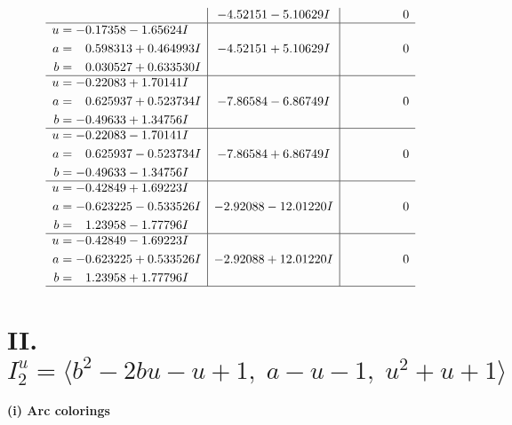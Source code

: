 \documentclass[1p]{elsarticle_modified}
\theoremstyle{definition}
\begin{document}
$$\begin{array}{c|c|c}
 & -4.52151 - 5.10629 I & \phantom{-0.000000 } 0 \\ \hline\begin{aligned}
u &= -0.17358 - 1.65624 I \\
a &= \phantom{-}0.598313 + 0.464993 I \\
b &= \phantom{-}0.030527 + 0.633530 I\end{aligned}
 & -4.52151 + 5.10629 I & \phantom{-0.000000 } 0 \\ \hline\begin{aligned}
u &= -0.22083 + 1.70141 I \\
a &= \phantom{-}0.625937 + 0.523734 I \\
b &= -0.49633 + 1.34756 I\end{aligned}
 & -7.86584 - 6.86749 I & \phantom{-0.000000 } 0 \\ \hline\begin{aligned}
u &= -0.22083 - 1.70141 I \\
a &= \phantom{-}0.625937 - 0.523734 I \\
b &= -0.49633 - 1.34756 I\end{aligned}
 & -7.86584 + 6.86749 I & \phantom{-0.000000 } 0 \\ \hline\begin{aligned}
u &= -0.42849 + 1.69223 I \\
a &= -0.623225 - 0.533526 I \\
b &= \phantom{-}1.23958 - 1.77796 I\end{aligned}
 & -2.92088 - 12.01220 I & \phantom{-0.000000 } 0 \\ \hline\begin{aligned}
u &= -0.42849 - 1.69223 I \\
a &= -0.623225 + 0.533526 I \\
b &= \phantom{-}1.23958 + 1.77796 I\end{aligned}
 & -2.92088 + 12.01220 I & \phantom{-0.000000 } 0\\
 \hline 
 \end{array}$$\newpage\newpage\renewcommand{\arraystretch}{1}
\centering \section*{II. $I^u_{2}= \langle b^2-2 b u- u+1,\;a- u-1,\;u^2+u+1 \rangle$}
\flushleft \textbf{(i) Arc colorings}\\
\end{document}

